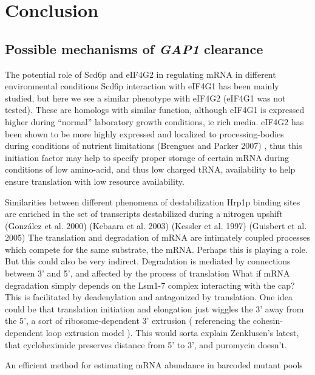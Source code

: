 \chapter{Conclusion}

\section{Possible mechanisms of \textit{GAP1} clearance}

The potential role of Scd6p and eIF4G2 in
regulating mRNA in different environmental conditions Scd6p
interaction with eIF4G1 has been mainly studied, but here we see a
similar phenotype with eIF4G2 (eIF4G1 was not tested). These are
homologs with similar function, although eIF4G1 is expressed higher
during “normal” laboratory growth conditions, ie rich media. eIF4G2
has been shown to be more highly expressed and localized to
processing-bodies during conditions of nutrient limitations 
(Brengues and Parker 2007)
, thus this initiation factor may help to specify
proper storage of certain mRNA during conditions of low amino-acid,
and thus low charged tRNA, availability to help ensure translation
with low resource availability. 

Similarities between different
phenomena of destabilization Hrp1p binding sites are enriched in the
set of transcripts destabilized during a nitrogen upshift 
(González et al. 2000) (Kebaara et al. 2003) (Kessler et al. 1997) (Guisbert et al.
2005) 
The translation and degradation of mRNA are intimately coupled
processes which compete for the same substrate, the mRNA. Perhaps this
is playing a role. But this could also be very indirect.  Degradation
is mediated by connections between 3’ and 5’, and affected by the
process of translation What if mRNA degradation simply depends on the
Lsm1-7 complex interacting with the cap? This is facilitated by
deadenylation and antagonized by translation. One idea could be that
translation initiation and elongation just wiggles the 3’ away from
the 5’, a sort of ribosome-dependent 3’ extrusion ( referencing the
cohesin-dependent loop extrusion model ).  This would sorta explain
Zenklusen’s latest, that cycloheximide preserves distance from 5’ to
3’, and puromycin doesn’t.  

An efficient method for estimating mRNA
abundance in barcoded mutant pools 



